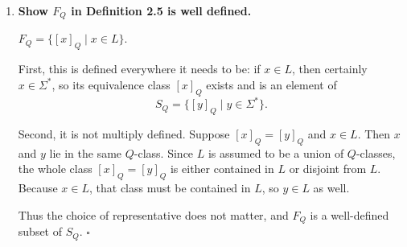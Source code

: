 \begin{enumerate}[{2.}1.]
\begin{enumerate}
Now show the pumping \emph{conclusion} of Theorem 2.3 does hold for $L$.
Take pumping length $N=3$. Let
\[
x=\mathbf a^n\mathbf b^k\mathbf c^j\in L,\quad |x|\ge3.
\]
We choose a decomposition $x=uvw$ with $|uv|\le3$, $|v|\ge1$, and show $uv^mw\in L$ for all $m\ge0$.

Case 1: $n\ge3$ (so $k=j$). Choose
\[
u=\lambda,\ v=\mathbf a,\ w=\mathbf a^{n-1}\mathbf b^k\mathbf c^k.
\]
Then $uv^mw=\mathbf a^{n-1+m}\mathbf b^k\mathbf c^k$.
If $n-1+m<3$, it is in $L$ by the $n<3$ clause.
If $n-1+m\ge3$, it is in $L$ because $k=j$ still holds.

Case 2: $n<3$. Since $|x|\ge3$, there is at least one non-$\mathbf a$ symbol, and its position is at most $3$.
Let $v$ be that first non-$\mathbf a$ symbol (either $\mathbf b$ or $\mathbf c$), with $u$ the preceding prefix.
Then $|uv|\le3$, $|v|=1$. Pumping changes only the number of $\mathbf b$'s or $\mathbf c$'s, not the number of $\mathbf a$'s, so $n<3$ remains true for all $m$. Therefore $uv^mw\in L$ for all $m\ge0$.

So the pumping conclusion holds even though $L$ is not FAD.

\item The contrapositive of Theorem 2.3: ``if pumping fails then $L$ is not FAD.'' This is trivially true (it's logically equivalent to Theorem 2.3). But here pumping doesn't fail, so the contrapositive doesn't give us information. The converse (``if pumping holds then $L$ is FAD'') is \emph{false}, as this example shows.
\end{enumerate}

\item \textbf{Show $F_Q$ in Definition 2.5 is well defined.}

$F_Q=\{[x]_Q\mid x\in L\}$.

First, this is defined everywhere it needs to be: if $x\in L$, then certainly $x\in\Sigma^*$, so its equivalence class $[x]_Q$ exists and is an element of
\[
S_Q=\{[y]_Q\mid y\in\Sigma^*\}.
\]

Second, it is not multiply defined. Suppose $[x]_Q=[y]_Q$ and $x\in L$. Then $x$ and $y$ lie in the same $Q$-class. Since $L$ is assumed to be a union of $Q$-classes, the whole class $[x]_Q=[y]_Q$ is either contained in $L$ or disjoint from $L$. Because $x\in L$, that class must be contained in $L$, so $y\in L$ as well.

Thus the choice of representative does not matter, and $F_Q$ is a well-defined subset of $S_Q$. $\square$


\end{enumerate}
